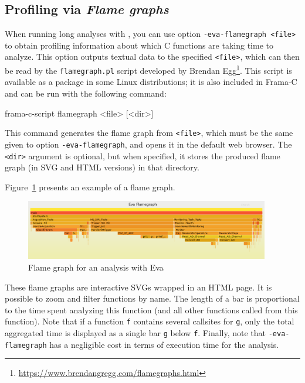 \documentclass{frama-c-book}
\begin{document}
\subsection{Profiling via {\em Flame graphs}}

When running long analyses with \Eva{}, you can use option
\texttt{-eva-flamegraph <file>} to obtain profiling information about which
C functions are taking time to analyze.
This option outputs textual data to the specified \texttt{<file>},
which can then be read by the \texttt{flamegraph.pl} script developed by
Brendan Egg\footnote{\url{https://www.brendangregg.com/flamegraphs.html}}.
This script is available as a package in some Linux distributions; it is
also included in Frama-C and can be run with the following command:

\begin{frama-c-commands}
frama-c-script flamegraph <file> [<dir>]
\end{frama-c-commands}

This command generates the flame graph from \texttt{<file>},
which must be the same given to option \texttt{-eva-flamegraph},
and opens it in the default web browser.
The \texttt{<dir>} argument is optional, but when specified, it stores the
produced flame graph (in SVG and HTML versions) in that directory.

Figure~\ref{fig:flamegraph} presents an example of a flame graph.

\begin{figure}[hbt]
\centering
\includegraphics[width=0.95\textwidth]{flamegraph.png}
\caption{Flame graph for an analysis with Eva}
\label{fig:flamegraph}
\end{figure}

These flame graphs are interactive SVGs wrapped in an HTML page.
It is possible to zoom and filter functions by name. The length of a bar is
proportional to the time spent analyzing this function (and all other functions
called from this function). Note that if a function \texttt{f}
contains several callsites for \texttt{g}, only the total aggregated time is
displayed as a single bar \texttt{g} below \texttt{f}.
Finally, note that \texttt{-eva-flamegraph} has a negligible cost in terms of
execution time for the analysis.
\end{document}
